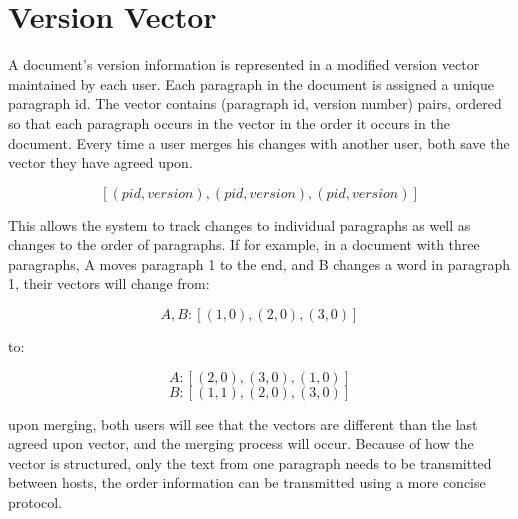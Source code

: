 \section{Version Vector}
A document's version information is represented in a modified version vector
maintained by each user. Each paragraph in the document is assigned a unique
paragraph id. The vector contains (paragraph id, version number)
pairs, ordered so that each paragraph occurs in the vector in the order it occurs
in the document. Every time a user merges his changes with another user, both save
the vector they have agreed upon.

$$
 [ (pid, version), (pid, version), (pid, version) ]
$$

This allows the system to track changes to individual paragraphs as well as changes
to the order of paragraphs. If for example, in a document with three paragraphs, 
A moves paragraph 1 to the end, and B changes a word in paragraph 1, their vectors
will change from:

$$ 
 A, B: [ (1, 0), (2, 0), (3, 0) ]
$$

to:

$$
 A: [ (2, 0), (3, 0), (1, 0) ] $$ $$ 
 B: [ (1, 1), (2, 0), (3, 0) ]
$$

upon merging, both users will see that the vectors are different than the last
agreed upon vector, and the merging process will occur. Because of how the vector
is structured, only the text from one paragraph needs to be transmitted between 
hosts, the order information can be transmitted using a more concise protocol.
